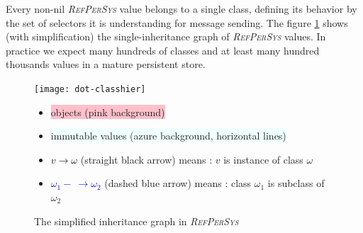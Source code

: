 \documentclass[11pt,a4paper,svgnames]{article}
\newcommand{\RefPerSys}{{\textit{\textsc{RefPerSys}}}}
\begin{document}
Every non-nil {\RefPerSys} value belongs to a single class, defining
its behavior by the set of selectors it is understanding for message
sending. The figure \ref{fig:inheritance} shows (with simplification)
the single-inheritance graph of {\RefPerSys} values. In practice we
expect many hundreds of classes and at least many hundred thousands
values in a mature persistent store.

\begin{figure}[h]
  \begin{center}
    \texttt{[image: dot-classhier]}
    \medskip
    \begin{relsize}{-1}
    \begin{itemize}
    \item \colorbox{pink}{objects (pink background)}
    \item \colorbox{Azure}{immutable values (azure background, horizontal lines)}
    \item \textcolor{black}{$v \longrightarrow \omega$} (straight  black arrow) means : $v$ is instance of class $\omega$
    \item \textcolor{blue}{$\omega_1 - ~ \rightarrow \omega_2 $} (dashed blue arrow) means : class $\omega_1$ is subclass of $\omega_2$
    \end{itemize}
    \end{relsize}
  \end{center}
  \caption{ The %
    simplified inheritance graph in \RefPerSys 
    }
  \label{fig:inheritance}
\end{figure}
\end{document}
